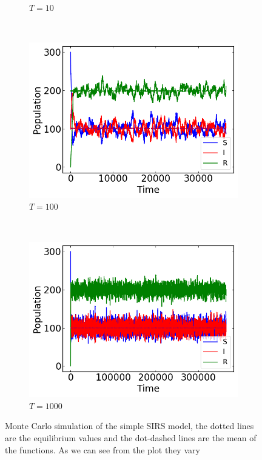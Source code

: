 \begin{figure}[H]
\begin{subfigure}{0.49\textwidth}
         \caption{$T = 10$}
    \end{subfigure}
     ~ 
    \begin{subfigure}{0.49\textwidth}
         \centering
         \includegraphics[width=\linewidth]{../fig/texfig/MC_T100.png}
         \caption{$T = 100$}
    \end{subfigure}
     ~ 
    \begin{subfigure}{0.49\textwidth}
         \centering
         \includegraphics[width=\linewidth]{../fig/texfig/MC_T1000.png}
         \caption{$T = 1000$}
    \end{subfigure}
    \caption{Monte Carlo simulation of the simple SIRS model, the dotted lines are the equilibrium values and the dot-dashed lines are the mean of the functions. As we can see from the plot they vary }
    \label{fig:MCb1Tchanges}
\end{figure}

